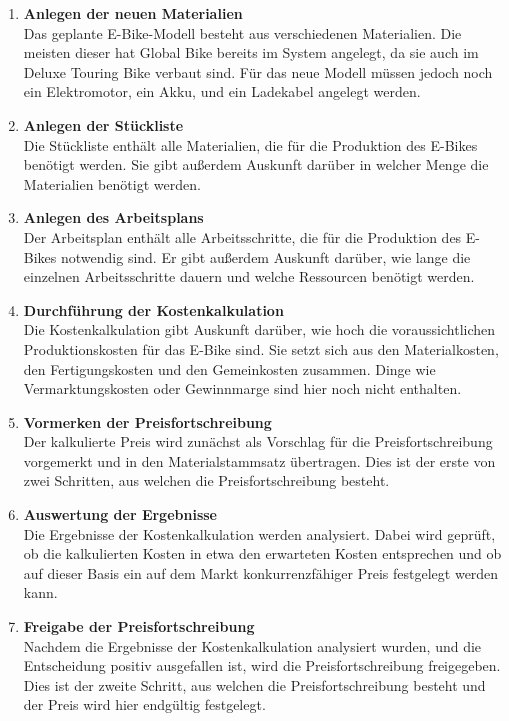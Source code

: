\begin{enumerate}
    \item \textbf{Anlegen der neuen Materialien}\\
    Das geplante E-Bike-Modell besteht aus verschiedenen Materialien. Die meisten dieser hat Global Bike bereits im System angelegt, da sie auch im Deluxe Touring Bike verbaut sind. Für das neue Modell müssen jedoch noch ein Elektromotor, ein Akku, und ein Ladekabel angelegt werden.
    \item \textbf{Anlegen der Stückliste}\\
    Die Stückliste enthält alle Materialien, die für die Produktion des E-Bikes benötigt werden. Sie gibt außerdem Auskunft darüber in welcher Menge die Materialien benötigt werden.
    \item \textbf{Anlegen des Arbeitsplans}\\
    Der Arbeitsplan enthält alle Arbeitsschritte, die für die Produktion des E-Bikes notwendig sind. Er gibt außerdem Auskunft darüber, wie lange die einzelnen Arbeitsschritte dauern und welche Ressourcen benötigt werden.
    \item \textbf{Durchführung der Kostenkalkulation}\\
    Die Kostenkalkulation gibt Auskunft darüber, wie hoch die voraussichtlichen Produktionskosten für das E-Bike sind. Sie setzt sich aus den Materialkosten, den Fertigungskosten und den Gemeinkosten zusammen. Dinge wie Vermarktungskosten oder Gewinnmarge sind hier noch nicht enthalten.
    \item \textbf{Vormerken der Preisfortschreibung}\\
    Der kalkulierte Preis wird zunächst als Vorschlag für die Preisfortschreibung vorgemerkt und in den Materialstammsatz übertragen. Dies ist der erste von zwei Schritten, aus welchen die Preisfortschreibung besteht.
    \item \textbf{Auswertung der Ergebnisse}\\
    Die Ergebnisse der Kostenkalkulation werden analysiert. Dabei wird geprüft, ob die kalkulierten Kosten in etwa den erwarteten Kosten entsprechen und ob auf dieser Basis ein auf dem Markt konkurrenzfähiger Preis festgelegt werden kann.
    \item \textbf{Freigabe der Preisfortschreibung}\\
    Nachdem die Ergebnisse der Kostenkalkulation analysiert wurden, und die Entscheidung positiv ausgefallen ist, wird die Preisfortschreibung freigegeben. Dies ist der zweite Schritt, aus welchen die Preisfortschreibung besteht und der Preis wird hier endgültig festgelegt.
\end{enumerate}
    
